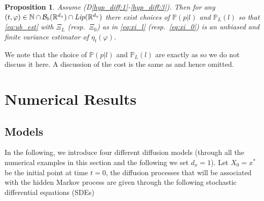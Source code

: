 \documentclass[english]{article}
\newtheorem{prop}{Proposition}[section]
\begin{document}
\begin{prop}\label{prop:coup_main_res}
Assume (D\ref{hyp_diff:1}-\ref{hyp_diff:3}). Then for any $(t,\varphi)\in\mathbb{N}\cap\mathcal{B}_b(\mathbb{R}^{d_x})\cap\textrm{\emph{Lip}}(\mathbb{R}^{d_x})$ there exist choices of  $\mathbb{P}(p|l)$ and $\mathbb{P}_L(l)$ so that 
\eqref{eq:ub_est} with $\Xi_L$ (resp.~$\Xi_0$) as in \eqref{eq:xi_l} (resp.~\eqref{eq:xi_0}) is an unbiased and finite variance estimator of $\eta_t(\varphi)$.
\end{prop}

We note that the choice of  $\mathbb{P}(p|l)$ and $\mathbb{P}_L(l)$  are exactly as \cite{ub_pf} so we do not discuss it here.  A discussion of the cost is the same as \cite[Section 3.2]{ub_pf} and hence omitted.

\section{Numerical Results}\label{sec:numerics}

\subsection{Models}

In the following, we introduce four different diffusion models (through all the numerical examples in this section and the following we set $d_x=1$). Let $X_0=x^*$ be the initial point at time $t=0$, the diffusion processes that will be associated with the hidden Markov process are given through the following stochastic differential equations (SDEs)
\end{document}
